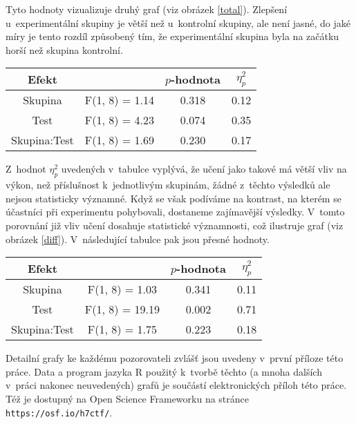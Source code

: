 
Tyto hodnoty vizualizuje druhý graf (viz obrázek \ref{total}). Zlepšení
u~experimentální skupiny je větší než u~kontrolní skupiny, ale není jasné, do
jaké míry je tento rozdíl způsobený tím, že experimentální skupina byla na začátku
horší než skupina kontrolní. 

\begin{center}
\begin{tabular}{cccc}
\hline\hline
       Efekt & &$p$-hodnota & $\eta^2_p$ \\
\hline                                            
       Skupina&F(1, 8) =   1.14& 0.318 & 0.12 \\ 
       Test &F(1, 8) =   4.23& 0.074 & 0.35 \\ 
 Skupina:Test&F(1, 8) =   1.69& 0.230 & 0.17 \\ 
\hline\hline

\end{tabular}
\end{center}

Z~hodnot $\eta^2_p$ uvedených v~tabulce vyplývá, že učení jako takové má větší vliv na výkon, než příslušnost k~jednotlivým skupinám, žádné z~těchto výsledků ale nejsou statisticky významné. Když se však podíváme na kontrast, na kterém se účastníci při experimentu pohybovali, dostaneme zajímavější výsledky. V~tomto porovnání již vliv učení dosahuje statistické významnosti, což ilustruje graf (viz obrázek \ref{diff}). V~následující tabulce pak jsou přesné hodnoty.

\begin{center}
\begin{tabular}{cccc}
\hline\hline
       Efekt & &$p$-hodnota & $\eta^2_p$ \\
\hline                                         
       Skupina& F(1, 8) =     1.03& 0.341&   0.11    \\
      Test& F(1, 8) =    19.19& 0.002&  0.71  \\
 Skupina:Test& F(1, 8) =     1.75& 0.223&  0.18       \\

\hline\hline

\end{tabular}
\end{center}




Detailní grafy ke každému pozorovateli zvlášť jsou uvedeny v~první příloze této práce.
Data a program jazyka R použitý k~tvorbě těchto (a mnoha dalších v~práci nakonec neuvedených) grafů je součástí
elektronických příloh této práce. Též je dostupný na Open Science Frameworku na stránce {\tt https://osf.io/h7ctf/}.


